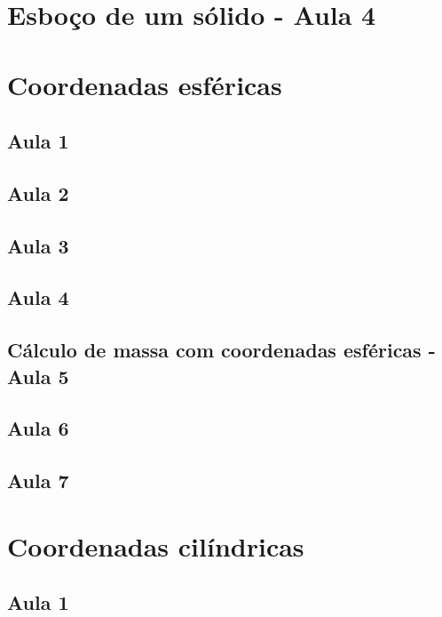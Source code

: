 \documentclass[12pt, a4paper]{article}
\begin{document}
		\section{Esboço de um sólido - Aula 4}
				
		\section{Coordenadas esféricas}
			\subsection{Aula 1}
							
			\subsection{Aula 2}
							
			\subsection{Aula 3}
				
			\subsection{Aula 4}
							
			\subsection[Aula 5]{Cálculo de massa com coordenadas esféricas - Aula 5}
						
			\subsection{Aula 6}
				
			\subsection{Aula 7}
				
		\section{Coordenadas cilíndricas}
			\subsection{Aula 1}
							
\end{document}
